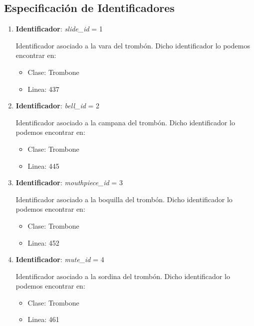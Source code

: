 \documentclass[10pt, a4paper]{article}
\begin{document}
\newpage

\subsection{Especificación de Identificadores}

\begin{enumerate}
	\item \textbf{Identificador}: \emph{slide\_id} = 1
	
	Identificador asociado a la vara del trombón. Dicho identificador lo podemos encontrar en:
	\begin{itemize}
		\item Clase: Trombone
		\item Linea: 437
	\end{itemize}
	\item \textbf{Identificador}: \emph{bell\_id} = 2
	
	Identificador asociado a la campana del trombón. Dicho identificador lo podemos encontrar en:
	\begin{itemize}
		\item Clase: Trombone
		\item Linea: 445
	\end{itemize}
	\item \textbf{Identificador}: \emph{mouthpiece\_id} = 3
	
	Identificador asociado a la boquilla del trombón. Dicho identificador lo podemos encontrar en:
	\begin{itemize}
		\item Clase: Trombone
		\item Linea: 452
	\end{itemize}
	\item \textbf{Identificador}: \emph{mute\_id} = 4
	
	Identificador asociado a la sordina del trombón. Dicho identificador lo podemos encontrar en:
	\begin{itemize}
		\item Clase: Trombone
		\item Linea: 461
	\end{itemize}
\end{enumerate}
\end{document}
